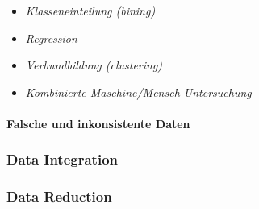 \begin{itemize}

\item \textit{Klasseneinteilung (bining)}

\item \textit{Regression}

\item \textit{Verbundbildung (clustering)}

\item \textit{Kombinierte Maschine/Mensch-Untersuchung}

\end{itemize}

\paragraph{Falsche und inkonsistente Daten}


\subsubsection{Data Integration}
\label{di}

\subsubsection{Data Reduction}
\label{dr}